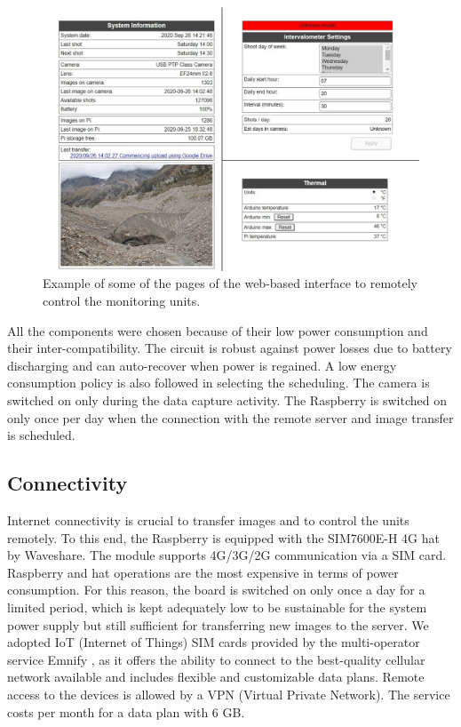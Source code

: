 \begin{figure}[ht!]
  \centering
  \includegraphics[width=1\textwidth]{web_interface.png}
  \caption{Example of some of the pages of the web-based interface to remotely control
    the monitoring units.}
  \label{fig:4:web-interface}
\end{figure}

All the components were chosen because of their low power consumption and their
inter-compatibility. 
The circuit is robust against power losses due to battery discharging and can auto-recover when power is regained. 
A low energy consumption policy is also followed in selecting the scheduling. 
The camera is switched on only during the data capture activity. 
The Raspberry is switched on only once per day when the connection with the remote server and image transfer is scheduled.

\subsection{Connectivity}\label{Connectivity}
Internet connectivity is crucial to transfer images and to control the units remotely. To
this end, the Raspberry is equipped with the SIM7600E-H 4G hat by Waveshare. The module
supports 4G/3G/2G communication via a SIM card. Raspberry and hat operations are the most
expensive in terms of power consumption. For this reason, the board is switched on only
once a day for a limited period, which is kept adequately low to be sustainable
for the system power supply but still sufficient for transferring new images to the
server. We adopted IoT (Internet of Things) SIM cards provided by the multi-operator
service Emnify \citep{emnify}, as it offers the ability to connect to the best-quality
cellular network available and includes flexible and customizable data plans.
Remote access to the devices is allowed by a VPN (Virtual Private Network).
The service costs  per month for a data plan with 6 GB.

